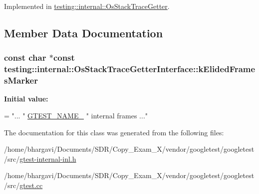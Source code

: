 Implemented in \hyperlink{classtesting_1_1internal_1_1_os_stack_trace_getter_a8ae0237629b6b5672b4b5ef8e292205c}{testing\+::internal\+::\+Os\+Stack\+Trace\+Getter}.



\subsection{Member Data Documentation}
\subsubsection[{\texorpdfstring{k\+Elided\+Frames\+Marker}{kElidedFramesMarker}}]{\setlength{\rightskip}{0pt plus 5cm}const char $\ast$const testing\+::internal\+::\+Os\+Stack\+Trace\+Getter\+Interface\+::k\+Elided\+Frames\+Marker\hspace{0.3cm}{\ttfamily [static]}}\hypertarget{classtesting_1_1internal_1_1_os_stack_trace_getter_interface_a669c49ce9ae05935e70bddb35a81ceb8}{}\label{classtesting_1_1internal_1_1_os_stack_trace_getter_interface_a669c49ce9ae05935e70bddb35a81ceb8}
{\bfseries Initial value\+:}
\begin{DoxyCode}
=
    \textcolor{stringliteral}{"... "} \hyperlink{gtest-port_8h_a13d98c217176bd8722c395b9225fc19d}{GTEST\_NAME\_} \textcolor{stringliteral}{" internal frames ..."}
\end{DoxyCode}


The documentation for this class was generated from the following files\+:\begin{DoxyCompactItemize}
\item 
/home/bhargavi/\+Documents/\+S\+D\+R/\+Copy\+\_\+\+Exam\+\_\+X/vendor/googletest/googletest/src/\hyperlink{gtest-internal-inl_8h}{gtest-\/internal-\/inl.\+h}\item 
/home/bhargavi/\+Documents/\+S\+D\+R/\+Copy\+\_\+\+Exam\+\_\+X/vendor/googletest/googletest/src/\hyperlink{gtest_8cc}{gtest.\+cc}\end{DoxyCompactItemize}
